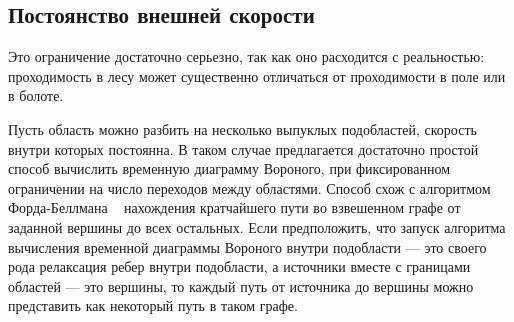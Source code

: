 \documentclass[12pt]{article}
\begin{document}
\subsection{Постоянство внешней скорости}
\label{multi_type}
Это ограничение достаточно серьезно, так как оно расходится с 
реальностью: проходимость в лесу может существенно отличаться от проходимости 
в поле или в болоте. 

Пусть область можно разбить на несколько выпуклых подобластей, скорость внутри которых
постоянна. В таком случае предлагается достаточно простой способ вычислить временную
диаграмму Вороного, при фиксированном ограничении на число переходов между областями.
Способ схож с алгоритмом Форда-Беллмана ~\cite{cormen} нахождения 
кратчайшего пути во взвешенном графе от заданной вершины до всех остальных. 
Если предположить, что запуск алгоритма вычисления временной диаграммы Вороного 
внутри подобласти --- это своего рода релаксация ребер внутри подобласти, 
а источники вместе с границами областей
--- это вершины, то каждый путь от источника до вершины можно представить
как некоторый путь в таком графе. 
\end{document}
